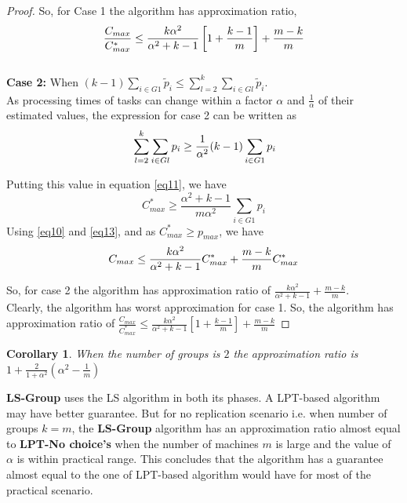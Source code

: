 \documentclass[10pt, conference, compsocconf]{IEEEtran}
\newtheorem{corollary}{Corollary}[theorem]
\begin{document}
\begin{proof}
 So, for Case 1 the algorithm has approximation ratio,
 \begin{equation}{\nonumber}
\frac{C_{max}}{C_{max}^{*}} \leq \frac{k\alpha^{2}}{\alpha^{2}+k-1}\left[1+ {\frac{k-1}{m}} \right]+ {\frac{m-k}{m}} \end{equation}\\

\textbf{Case 2:} When $(k-1)\sum_{i \in G1 }^{}{\tilde p_{i}} \leq \sum_{l=2}^{k}\sum_{i \in Gl }^{}{\tilde p_{i}}$. \\

As processing times of tasks  can change within a factor $\alpha$ and $\frac{1}{\alpha}$ of their estimated values, the expression for case 2 can be written as 
\begin{equation}{\nonumber}
\sum_{l=2}^{k}\sum_{i \in Gl }^{}{ p_{i}} \geq \frac{1}{\alpha^2} (k-1)\sum_{i \in G1 }^{}{ p_{i}}
\end{equation}

Putting this value in equation \ref{eq11}, we have
\begin{equation}\label{eq13}
 C_{max}^{*} \geq \frac{\alpha^2+k-1}{m\alpha^2}\sum_{i \in G1 }^{}{ p_{i}}
\end{equation}
Using \ref{eq10} and \ref{eq13}, and as $C_{max}^{*} \geq p_{max}$, we have
\begin{equation}{\nonumber}
 C_{max} \leq \frac{k\alpha^2}{\alpha^2+k-1}C_{max}^{*}+\frac{m-k}{m}C_{max}^{*}
\end{equation}

So, for case 2 the algorithm has approximation ratio of $\frac{k\alpha^2}{\alpha^2+k-1}+\frac{m-k}{m}$.\\
Clearly, the algorithm has worst approximation for case 1.  So, the algorithm has approximation ratio of $\frac{C_{max}}{C_{max}^{*}} \leq \frac{k\alpha^{2}}{\alpha^{2}+k-1}\left[1+ {\frac{k-1}{m}} \right]+ {\frac{m-k}{m}}$



 
\end{proof}

\begin{corollary}
 When the number of groups is $2$ the approximation ratio is $ 1+ \frac{2}{1+\alpha^{2}} (\alpha^2-\frac{1}{m})  $ 
\end{corollary}

 \textbf{LS-Group} uses the LS algorithm in both its phases. A LPT-based algorithm may have better guarantee. But for no replication scenario i.e. when number of groups $k=m$, the \textbf{LS-Group} algorithm has an approximation ratio almost equal to \textbf{LPT-No choice's} when the number of machines $m$ is large and the value of $\alpha$ is within practical range. This concludes that the algorithm has a guarantee almost equal to the one of LPT-based algorithm would have for most of the practical scenario.
\end{document}
